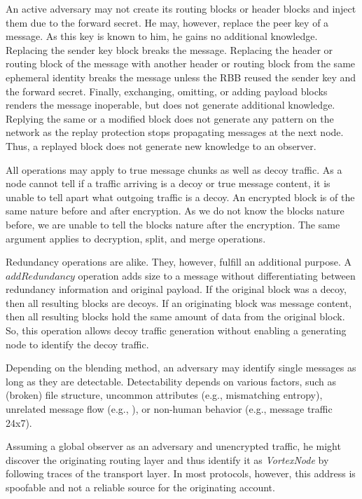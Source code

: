 \documentclass[acmsmall, screen, review]{acmart}
\begin{document}
An active adversary may not create its routing blocks or header blocks and inject them due to the forward secret. He may, however, replace the peer key of a message. As this key is known to him, he gains no additional knowledge. Replacing the sender key block breaks the message. Replacing the header or routing block of the message with another header or routing block from the same ephemeral identity breaks the message unless the RBB reused the sender key and the forward secret. Finally, exchanging, omitting, or adding payload blocks renders the message inoperable, but does not generate additional knowledge. Replying the same or a modified block does not generate any pattern on the network as the replay protection stops propagating messages at the next node. Thus, a replayed block does not generate new knowledge to an observer.

All operations may apply to true message chunks as well as decoy traffic. As a node cannot tell if a traffic arriving is a decoy or true message content, it is unable to tell apart what outgoing traffic is a decoy. An encrypted block is of the same nature before and after encryption. As we do not know the blocks nature before, we are unable to tell the blocks nature after the encryption. The same argument applies to decryption, split, and merge operations. 

Redundancy operations are alike. They, however, fulfill an additional purpose. A $addRedundancy$ operation adds size to a message without differentiating between redundancy information and original payload. If the original block was a decoy, then all resulting blocks are decoys. If an originating block was message content, then all resulting blocks hold the same amount of data from the original block. So, this operation allows decoy traffic generation without enabling a generating node to identify the decoy traffic.

Depending on the blending method, an adversary may identify single messages as long as they are detectable. Detectability depends on various factors, such as (broken) file structure, uncommon attributes (e.g., mismatching entropy), unrelated message flow (e.g., \cite{oakland2013-parrot}), or non-human behavior (e.g., message traffic 24x7).

Assuming a global observer as an adversary and unencrypted traffic, he might discover the originating routing layer and thus identify it as \emph{VortexNode} by following traces of the transport layer. In most protocols, however, this address is spoofable and not a reliable source for the originating account.
\end{document}
